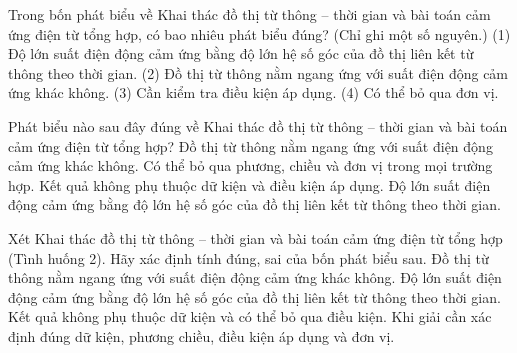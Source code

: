 \begin{ex}
Trong bốn phát biểu về Khai thác đồ thị từ thông – thời gian và bài toán cảm ứng điện từ tổng hợp, có bao nhiêu phát biểu đúng? (Chỉ ghi một số nguyên.) (1) Độ lớn suất điện động cảm ứng bằng độ lớn hệ số góc của đồ thị liên kết từ thông theo thời gian. (2) Đồ thị từ thông nằm ngang ứng với suất điện động cảm ứng khác không. (3) Cần kiểm tra điều kiện áp dụng. (4) Có thể bỏ qua đơn vị.
\end{ex}

\begin{ex}
Phát biểu nào sau đây đúng về Khai thác đồ thị từ thông – thời gian và bài toán cảm ứng điện từ tổng hợp?
\choice
{Đồ thị từ thông nằm ngang ứng với suất điện động cảm ứng khác không.}
{Có thể bỏ qua phương, chiều và đơn vị trong mọi trường hợp.}
{Kết quả không phụ thuộc dữ kiện và điều kiện áp dụng.}
{\True Độ lớn suất điện động cảm ứng bằng độ lớn hệ số góc của đồ thị liên kết từ thông theo thời gian.}
\end{ex}

\begin{ex}
Xét Khai thác đồ thị từ thông – thời gian và bài toán cảm ứng điện từ tổng hợp (Tình huống 2). Hãy xác định tính đúng, sai của bốn phát biểu sau.
\choiceTF
{Đồ thị từ thông nằm ngang ứng với suất điện động cảm ứng khác không.}
{\True Độ lớn suất điện động cảm ứng bằng độ lớn hệ số góc của đồ thị liên kết từ thông theo thời gian.}
{Kết quả không phụ thuộc dữ kiện và có thể bỏ qua điều kiện.}
{\True Khi giải cần xác định đúng dữ kiện, phương chiều, điều kiện áp dụng và đơn vị.}
\end{ex}


